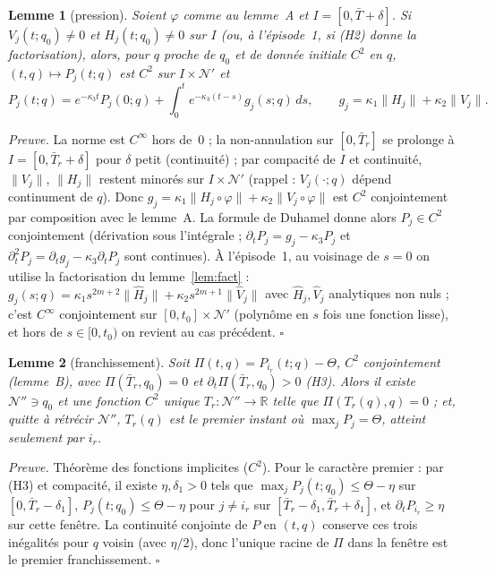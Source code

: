 \documentclass[11pt,a4paper]{article}
\newtheorem{lemme}{Lemme}
\theoremstyle{remark}
\newcommand{\R}{\mathbb R}
\newcommand{\norm}[1]{\lVert #1\rVert}
\begin{document}
\begin{lemme}[pression]\label{lem:B}Soient $\varphi$ comme au lemme~A et $I=[0,\bar T+\delta]$. Si $V_j(t;q_0)\neq0$ et $H_j(t;q_0)\ne0$ sur $I$ (ou, \`a l'\'episode~1, si (H2) donne la factorisation), alors, pour $q$ proche de $q_0$ et de donn\'ee initiale $C^2$ en $q$, $(t,q)\mapsto P_j(t;q)$ est $C^2$ sur $I\times\mathcal N'$ et
\[ P_j(t;q)=e^{-\kappa_3t}P_j(0;q)+\int_0^te^{-\kappa_3(t-s)}g_j(s;q)\,ds,\qquad g_j=\kappa_1\norm{H_j}+\kappa_2\norm{V_j}. \]
\end{lemme}
\emph{Preuve.} La norme est $C^\infty$ hors de~$0$ ; la non-annulation sur $[0,\bar T_r]$ se prolonge \`a $I=[0,\bar T_r+\delta]$ pour $\delta$ petit (continuit\'e) ; par compacit\'e de $I$ et continuit\'e, $\norm{V_j}$, $\norm{H_j}$ restent minor\'es sur $I\times\mathcal N'$ (rappel : $V_j(\cdot;q)$ d\'epend continument de $q$). Donc $g_j=\kappa_1\norm{H_j\circ\varphi}+\kappa_2\norm{V_j\circ\varphi}$ est $C^2$ conjointement par composition avec le lemme~A. La formule de Duhamel donne alors $P_j\in C^2$ conjointement (d\'erivation sous l'int\'egrale ; $\partial_tP_j=g_j-\kappa_3P_j$ et $\partial_t^2P_j=\partial_tg_j-\kappa_3\partial_tP_j$ sont continues). \`A l'\'episode~1, au voisinage de $s=0$ on utilise la factorisation du lemme~\ref{lem:fact} : $g_j(s;q)=\kappa_1s^{2m+2}\norm{\hat H_j}+\kappa_2s^{2m+1}\norm{\hat V_j}$ avec $\hat H_j,\hat V_j$ analytiques non nuls ; c'est $C^\infty$ conjointement sur $[0,t_0]\times\mathcal N'$ (polyn\^ome en $s$ fois une fonction lisse), et hors de $s\in[0,t_0)$ on revient au cas pr\'ec\'edent. $\square$

\begin{lemme}[franchissement]\label{lem:C}Soit $\Pi(t,q)=P_{i_r}(t;q)-\Theta$, $C^2$ conjointement (lemme~B), avec $\Pi(\bar T_r,q_0)=0$ et $\partial_t\Pi(\bar T_r,q_0)>0$ (H3). Alors il existe $\mathcal N''\ni q_0$ et une fonction $C^2$ unique $T_r:\mathcal N''\to\R$ telle que $\Pi(T_r(q),q)=0$ ; et, quitte \`a r\'etr\'ecir $\mathcal N''$, $T_r(q)$ est \emph{le premier} instant o\`u $\max_jP_j=\Theta$, atteint seulement par $i_r$.\end{lemme}

\emph{Preuve.} Th\'eor\`eme des fonctions implicites ($C^2$). Pour le caract\`ere \og premier \fg{} : par (H3) et compacit\'e, il existe $\eta,\delta_1>0$ tels que $\max_jP_j(t;q_0)\le\Theta-\eta$ sur $[0,\bar T_r-\delta_1]$, $P_j(t;q_0)\le\Theta-\eta$ pour $j\neq i_r$ sur $[\bar T_r-\delta_1,\bar T_r+\delta_1]$, et $\partial_tP_{i_r}\ge\eta$ sur cette fen\^etre. La continuit\'e conjointe de $P$ en $(t,q)$ conserve ces trois in\'egalit\'es pour $q$ voisin (avec $\eta/2$), donc l'unique racine de $\Pi$ dans la fen\^etre est le premier franchissement. $\square$
\end{document}

